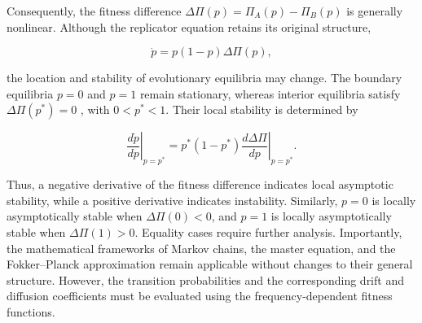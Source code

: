 Consequently, the fitness difference \(\Delta\Pi(p)=\Pi_A(p)-\Pi_B(p)\) is generally nonlinear. Although the replicator equation retains its original structure,

\begin{equation}
\dot p=p(1-p)\Delta\Pi(p),
\end{equation}

the location and stability of evolutionary equilibria may change. The boundary equilibria \(p=0\) and \(p=1\) remain stationary, whereas interior equilibria satisfy \(\Delta\Pi(p^*)=0\)  , with \(0<p^*<1\). Their local stability is determined by

\begin{equation}
\left.\frac{d\dot p}{dp}\right|_{p=p^*}
=
p^*(1-p^*)
\left.\frac{d\Delta\Pi}{dp}\right|_{p=p^*}.
\label{eq:estabilidad}
\end{equation}

Thus, a negative derivative of the fitness difference indicates local asymptotic stability, while a positive derivative indicates instability. Similarly, \(p=0\) is locally asymptotically stable when \(\Delta\Pi(0)<0\), and \(p=1\) is locally asymptotically stable when \(\Delta\Pi(1)>0\). Equality cases require further analysis. Importantly, the mathematical frameworks of Markov chains, the master equation, and the Fokker--Planck approximation remain applicable without changes to their general structure. However, the transition probabilities and the corresponding drift and diffusion coefficients must be evaluated using the frequency-dependent fitness functions. \\ 



